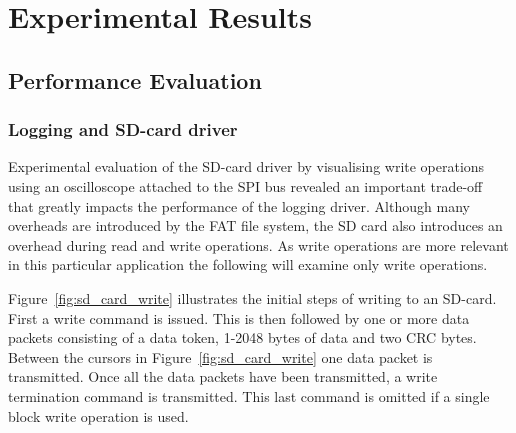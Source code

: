 

\chapter{Experimental Results}

\section{Performance Evaluation}

\subsection{Logging and SD-card driver} \label{logging_perf}

Experimental evaluation of the SD-card driver by visualising write operations using an oscilloscope attached to the SPI bus revealed an important trade-off that greatly impacts the performance of the logging driver. Although many overheads are introduced by the FAT file system, the SD card also introduces an overhead during read and write operations. As write operations are more relevant in this particular application the following will examine only write operations.

Figure~\ref{fig:sd_card_write} illustrates the initial steps of writing to an SD-card. First a write command is issued. This is then followed by one or more data packets consisting of a data token, 1-2048 bytes of data and two CRC bytes. Between the cursors in Figure~\ref{fig:sd_card_write} one data packet is transmitted. Once all the data packets have been transmitted, a write termination command is transmitted. This last command is omitted if a single block write operation is used.

